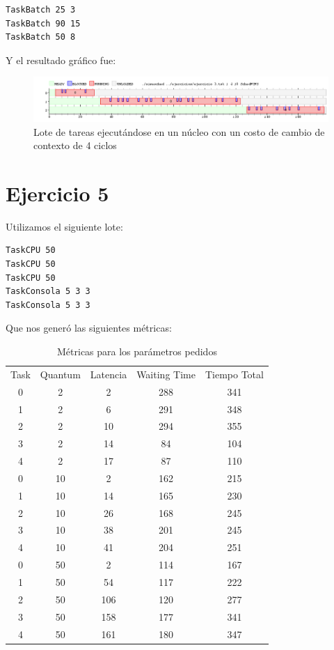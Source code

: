 \documentclass{article}
\begin{document}
\begin{verbatim}
TaskBatch 25 3
TaskBatch 90 15
TaskBatch 50 8
\end{verbatim}

Y el resultado gráfico fue:

\begin{figure}[h!]
\caption{Lote de tareas ejecutándose en un núcleo con un costo de cambio de contexto de 4 ciclos \label{grf:ex3}}
\centering
\includegraphics[width=15cm]{../ejercicios/ejercicio 3}
\end{figure}

\section{Ejercicio 5}

Utilizamos el siguiente lote:

\begin{verbatim}
TaskCPU 50
TaskCPU 50
TaskCPU 50
TaskConsola 5 3 3
TaskConsola 5 3 3
\end{verbatim}

Que nos generó las siguientes métricas:

\begin{table}[h!]
\centering
\caption{Métricas para los parámetros pedidos}
\label{tbl:ex5}
\begin{tabular}{ccccc}
Task & Quantum & Latencia & Waiting Time & Tiempo Total \\
0    & 2       & 2        & 288          & 341           \\
1    & 2       & 6        & 291          & 348           \\
2    & 2       & 10       & 294          & 355           \\
3    & 2       & 14       & 84           & 104            \\
4    & 2       & 17       & 87           & 110            \\
0    & 10      & 2        & 162          & 215           \\
1    & 10      & 14       & 165          & 230           \\
2    & 10      & 26       & 168          & 245           \\
3    & 10      & 38       & 201          & 245            \\
4    & 10      & 41       & 204          & 251            \\
0    & 50      & 2        & 114          & 167           \\
1    & 50      & 54       & 117          & 222           \\
2    & 50      & 106      & 120          & 277           \\
3    & 50      & 158      & 177          & 341            \\
4    & 50      & 161      & 180          & 347           
\end{tabular}
\end{table}
\end{document}
